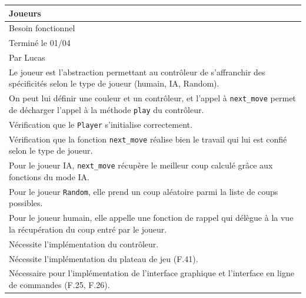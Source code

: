 \documentclass[a4paper,12pt]{article}
\begin{document}
\noindent
\setlength{\arrayrulewidth}{1.5pt}
\renewcommand{\arraystretch}{1.5}
\begin{tabularx}{\textwidth}{|X|}
    \hline
    \textbf{Joueurs}                                                                                                                                         \\
    \hline
    Besoin fonctionnel                                                                                                                                       \\
    \hline
    Terminé le 01/04                                                                                                                                         \\
    Par Lucas                                                                                                                                                \\
    \hline
    Le joueur est l’abstraction permettant au contrôleur de s’affranchir des spécificités selon le type de joueur (humain, IA, Random).                      \\
    On peut lui définir une couleur et un contrôleur, et l’appel à \texttt{next\_move} permet de décharger l’appel à la méthode \texttt{play} du contrôleur. \\
    \arrayrulecolor{MediumAquamarine}\hline
    \arrayrulecolor{CornflowerBlue}
    Vérification que le \texttt{Player} s’initialise correctement.                                                                                           \\
    Vérification que la fonction \texttt{next\_move} réalise bien le travail qui lui est confié selon le type de joueur.                                     \\
    Pour le joueur IA, \texttt{next\_move} récupère le meilleur coup calculé grâce aux fonctions du mode IA.                                                 \\
    Pour le joueur \texttt{Random}, elle prend un coup aléatoire parmi la liste de coups possibles.                                                          \\
    Pour le joueur humain, elle appelle une fonction de rappel qui délègue à la vue la récupération du coup entré par le joueur.                             \\
    \arrayrulecolor{MediumAquamarine}\hline
    \arrayrulecolor{CornflowerBlue}
    Nécessite l’implémentation du contrôleur.                                                                                                                \\
    Nécessite l’implémentation du plateau de jeu (F.41).                                                                                                     \\
    Nécessaire pour l’implémentation de l’interface graphique et l’interface en ligne de commandes (F.25, F.26).                                             \\
    \hline
\end{tabularx}
\end{document}
